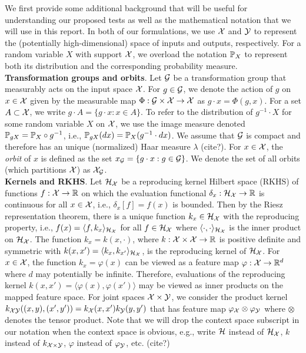 We first provide some additional background that will be useful for understanding our proposed tests as well as the mathematical notation that we will use in this report. In both of our formulations, we use $\calX$ and $\calY$ to represent the (potentially high-dimensional) space of inputs and outputs, respectively. For a random variable $X$ with support $\calX$, we overload the notation $\P_X$ to represent both its distribution and the corresponding probability measure.
\\

\textbf{Transformation groups and orbits}. Let $\calG$ be a transformation group that measurably acts on the input space $\calX$. For $g\in\calG$, we denote the action of $g$ on $x\in\calX$ given by the measurable map $\Phi:\calG\times\calX\rightarrow\calX$ as $g\cdot x = \Phi(g,x)$. For a set $A\subset\calX$, we write $g\cdot A=\{g\cdot x: x\in A\}$. To refer to the distribution of $g^{-1}\cdot X$ for some random variable $X$ on $\calX$, we use the image measure denoted $\P_{gX}=\P_X\circ g^{-1}$, i.e., $\P_{gX}(dx)=\P_X(g^{-1}\cdot dx)$. We assume that $\calG$ is compact and therefore has an unique (normalized) Haar measure $\lambda$ (\todo cite?). For $x\in\calX$, the \textit{orbit} of $x$ is defined as the set $x_\calG=\{g\cdot x:g\in\calG\}$. We denote the set of all orbits (which partitions $\calX$) as $\calX_\calG$.
\\

\textbf{Kernels and RKHS}. Let $\calH_\calX$ be a reproducing kernel Hilbert space (RKHS) of functions $f:\calX\rightarrow\bbR$ on which the evaluation functional $\delta_x:\calH_\calX\rightarrow\bbR$ is continuous for all $x\in\calX$, i.e., $\delta_x[f]=f(x)$ is bounded. Then by the Riesz representation theorem, there is a unique function $k_x\in\calH_\calX$ with the reproducing property, i.e., $f(x)=\langle f,k_x\rangle_{\calH_\calX}$ for all $f\in\calH_\calX$ where $\langle\cdot,\cdot\rangle_{\calH_\calX}$ is the inner product on $\calH_{\calX}$. The function $k_x=k(x,\cdot)$, where $k:\calX\times\calX\rightarrow\bbR$ is positive definite and symmetric with $k(x,x')=\langle k_x,k_{x'}\rangle_{\calH_\calX}$, is the reproducing kernel of $\calH_\calX$. For $x\in\calX$, the function $k_x=\varphi(x)$ can be viewed as a feature map $\varphi:\calX\rightarrow\bbR^d$ where $d$ may potentially be infinite. Therefore, evaluations of the reproducing kernel $k(x,x')=\langle \varphi(x),\varphi(x')\rangle$ may be viewed as inner products on the mapped feature space. For joint spaces $\calX\times\calY$, we consider the product kernel $k_{\calX\calY}((x,y),(x',y'))=k_\calX(x,x')k_\calY(y,y')$ that has feature map $\varphi_\calX\otimes\varphi_\calY$ where $\otimes$ denotes the tensor product. Note that we will drop the context space subscript in our notation when the context space is obvious, e.g., write $\calH$ instead of $\calH_\calX$, $k$ instead of $k_{\calX\times\calY}$, $\varphi$ instead of $\varphi_\calY$, etc. (\todo cite?)
\\

